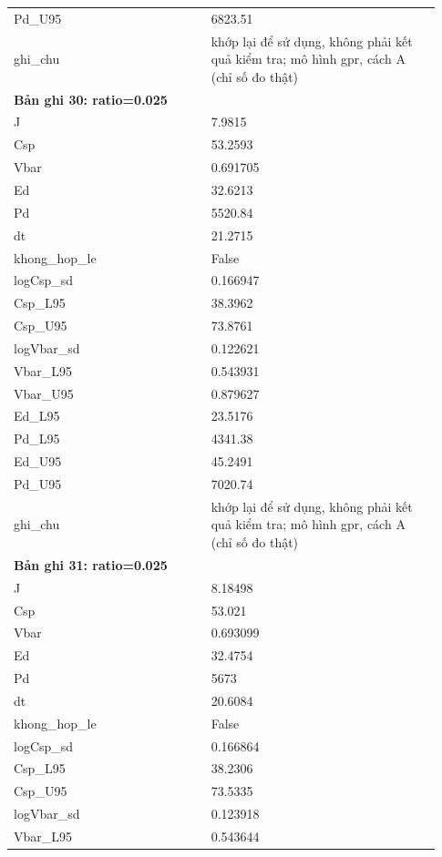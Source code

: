 \begin{longtable}{p{0.43\linewidth}p{0.50\linewidth}}
Pd\_\allowbreak U95 & 6823.51 \\
ghi\_\allowbreak chu & khớp lại để sử dụng, không phải kết quả kiểm tra; mô hình gpr, cách A (chỉ số đo thật) \\
\midrule
\multicolumn{2}{p{0.95\linewidth}}{\textbf{Bản ghi 30: ratio=0.025}} \\
J & 7.9815 \\
Csp & 53.2593 \\
Vbar & 0.691705 \\
Ed & 32.6213 \\
Pd & 5520.84 \\
dt & 21.2715 \\
khong\_\allowbreak hop\_\allowbreak le & False \\
logCsp\_\allowbreak sd & 0.166947 \\
Csp\_\allowbreak L95 & 38.3962 \\
Csp\_\allowbreak U95 & 73.8761 \\
logVbar\_\allowbreak sd & 0.122621 \\
Vbar\_\allowbreak L95 & 0.543931 \\
Vbar\_\allowbreak U95 & 0.879627 \\
Ed\_\allowbreak L95 & 23.5176 \\
Pd\_\allowbreak L95 & 4341.38 \\
Ed\_\allowbreak U95 & 45.2491 \\
Pd\_\allowbreak U95 & 7020.74 \\
ghi\_\allowbreak chu & khớp lại để sử dụng, không phải kết quả kiểm tra; mô hình gpr, cách A (chỉ số đo thật) \\
\midrule
\multicolumn{2}{p{0.95\linewidth}}{\textbf{Bản ghi 31: ratio=0.025}} \\
J & 8.18498 \\
Csp & 53.021 \\
Vbar & 0.693099 \\
Ed & 32.4754 \\
Pd & 5673 \\
dt & 20.6084 \\
khong\_\allowbreak hop\_\allowbreak le & False \\
logCsp\_\allowbreak sd & 0.166864 \\
Csp\_\allowbreak L95 & 38.2306 \\
Csp\_\allowbreak U95 & 73.5335 \\
logVbar\_\allowbreak sd & 0.123918 \\
Vbar\_\allowbreak L95 & 0.543644 \\

\end{longtable}
